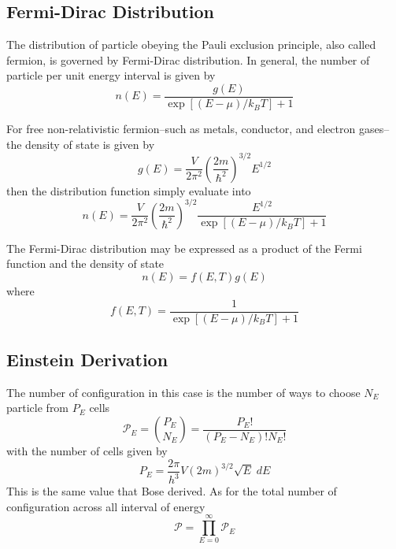 \documentclass[../../../Main.tex]{subfiles}
\begin{document}
\subsection*{Fermi-Dirac Distribution}
The distribution of particle obeying the Pauli exclusion principle, also called fermion, is governed by Fermi-Dirac distribution. In general, the number of particle per unit energy interval is given by 
\begin{equation*}
    n(E)=\frac{g(E)}{\exp\left[(E-\mu)/k_BT\right]+1}
\end{equation*}

For free non-relativistic fermion--such as metals, conductor, and electron gases--the density of state is given by
\begin{equation*}
    g(E)=\frac{V}{2\pi^2}\left(\frac{2m}{\hbar^2}\right)^{3/2}E^{1/2}
\end{equation*}
then the distribution function simply evaluate into
\begin{equation*}
    n(E)=\frac{V}{2\pi^2}\left(\frac{2m}{\hbar^2}\right)^{3/2}\frac{{E}^{1/2}}{\exp\left[(E-\mu)/k_BT\right]+1}
\end{equation*}

The Fermi-Dirac distribution may be expressed as a product of the Fermi function and the density of state
\begin{equation*}
    n(E)=f(E,T)g(E)
\end{equation*}
where
\begin{equation*}
    f(E,T)=\frac{1}{\exp\left[(E-\mu)/k_BT\right]+1}
\end{equation*}
\subsection*{Einstein Derivation}
The number of configuration in this case is the number of ways to choose $N_E$ particle from $P_E$ cells
\begin{equation*}
    \mathcal{P}_E={P_E \choose N_E}=\frac{P_E!}{(P_E-N_E)!N_E!}
\end{equation*}
with the number of cells given by
\begin{equation*}
    P_E= \frac{2\pi}{h^3}V(2m)^{3/2}\sqrt{E}\;dE
\end{equation*}
This is the same value that Bose derived. As for the total number of configuration across all interval of energy
\begin{equation*}
    \mathcal{P}=\prod_{E=0}^{\infty}\mathcal{P}_E
\end{equation*}
\end{document}

